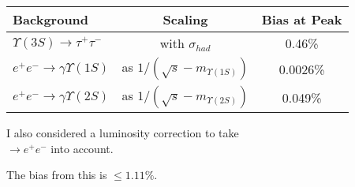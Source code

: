 \begin{slide*}

\slideframe{}
\huge
{}

\begin{minipage}[t]{\linewidth}
\Large

\vspace{1 cm}

\begin{center}

\begin{tabular}{l c c}
Background & Scaling & Bias at Peak \\\hline
$\Upsilon(3S) \to \tau^{+} \tau^{-}$ & with $\sigma_{had}$ & 0.46\% \\
$e^{+} e^{-} \to \gamma \Upsilon(1S)$ & as $1/(\sqrt{s} - m_{\Upsilon(1S)})$ & 0.0026\% \\
$e^{+} e^{-} \to \gamma \Upsilon(2S)$ & as $1/(\sqrt{s} - m_{\Upsilon(2S)})$ & 0.049\% \\
\end{tabular}

\end{center}

\vspace{1 cm}

{\LARGE I also considered a luminosity correction to take \\
\ysss $\to e^{+} e^{-}$ into account.}

\vspace{0.5 cm}

{\LARGE The bias from this is $\le 1.11\%$.}

\end{minipage}

\end{slide*}


